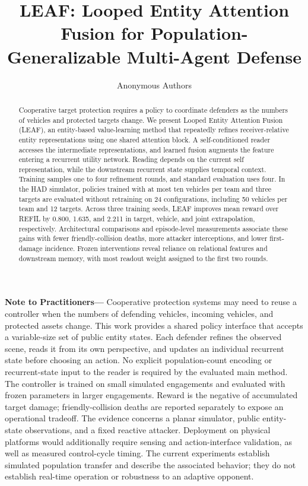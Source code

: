 \documentclass[journal,10pt]{IEEEtran}
\begin{document}
\title{LEAF: Looped Entity Attention Fusion for Population-Generalizable Multi-Agent Defense}
\author{Anonymous Authors}
\maketitle
{}
\begin{abstract}
Cooperative target protection requires a policy to coordinate defenders as the numbers of vehicles and protected targets change. We present Looped Entity Attention Fusion (LEAF), an entity-based value-learning method that repeatedly refines receiver-relative entity representations using one shared attention block. A self-conditioned reader accesses the intermediate representations, and learned fusion augments the feature entering a recurrent utility network. Reading depends on the current self representation, while the downstream recurrent state supplies temporal context. Training samples one to four refinement rounds, and standard evaluation uses four. In the HAD simulator, policies trained with at most ten vehicles per team and three targets are evaluated without retraining on 24 configurations, including 50 vehicles per team and 12 targets. Across three training seeds, LEAF improves mean reward over REFIL by 0.800, 1.635, and 2.211 in target, vehicle, and joint extrapolation, respectively. Architectural comparisons and episode-level measurements associate these gains with fewer friendly-collision deaths, more attacker interceptions, and lower first-damage incidence. Frozen interventions reveal reliance on relational features and downstream memory, with most readout weight assigned to the first two rounds.
\end{abstract}
\noindent\textbf{Note to Practitioners---}
Cooperative protection systems may need to reuse a controller when the numbers of defending vehicles, incoming vehicles, and protected assets change. This work provides a shared policy interface that accepts a variable-size set of public entity states. Each defender refines the observed scene, reads it from its own perspective, and updates an individual recurrent state before choosing an action. No explicit population-count encoding or recurrent-state input to the reader is required by the evaluated main method. The controller is trained on small simulated engagements and evaluated with frozen parameters in larger engagements. Reward is the negative of accumulated target damage; friendly-collision deaths are reported separately to expose an operational tradeoff. The evidence concerns a planar simulator, public entity-state observations, and a fixed reactive attacker. Deployment on physical platforms would additionally require sensing and action-interface validation, as well as measured control-cycle timing. The current experiments establish simulated population transfer and describe the associated behavior; they do not establish real-time operation or robustness to an adaptive opponent.
\end{document}
